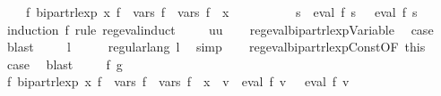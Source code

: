 \begin{isabellebody}
\ \ \ \ {\isasymexists}f{\isacharprime}{\kern0pt}{\isachardot}{\kern0pt}\ bipart{\isacharunderscore}{\kern0pt}rlexp\ x\ f{\isacharprime}{\kern0pt}\ {\isasymand}\ vars\ f{\isacharprime}{\kern0pt}\ {\isacharequal}{\kern0pt}\ vars\ f\ {\isasymunion}\ {\isacharbraceleft}{\kern0pt}x{\isacharbraceright}{\kern0pt}\ {\isasymand}\isanewline
\ \ \ \ \ \ \ \ \ {\isacharparenleft}{\kern0pt}{\isasymforall}s{\isachardot}{\kern0pt}\ {\isasymPsi}\ {\isacharparenleft}{\kern0pt}eval\ f\ s{\isacharparenright}{\kern0pt}\ {\isacharequal}{\kern0pt}\ {\isasymPsi}\ {\isacharparenleft}{\kern0pt}eval\ f{\isacharprime}{\kern0pt}\ s{\isacharparenright}{\kern0pt}{\isacharparenright}{\kern0pt}{\isachardoublequoteclose}\isanewline
%
\isadelimproof
%
\endisadelimproof
%
\isatagproof
{}\isamarkupfalse%
\ {\isacharparenleft}{\kern0pt}induction\ f\ rule{\isacharcolon}{\kern0pt}\ reg{\isacharunderscore}{\kern0pt}eval{\isachardot}{\kern0pt}induct{\isacharparenright}{\kern0pt}\isanewline
\ \ \isamarkupfalse%
\ {\isacharparenleft}{\kern0pt}{}\ uu{\isacharparenright}{\kern0pt}\isanewline
\ \ \isamarkupfalse%
\ reg{\isacharunderscore}{\kern0pt}eval{\isacharunderscore}{\kern0pt}bipart{\isacharunderscore}{\kern0pt}rlexp{\isacharunderscore}{\kern0pt}Variable\ \isamarkupfalse%
\ {\isacharquery}{\kern0pt}case\ \isamarkupfalse%
\ blast\isanewline
{}\isamarkupfalse%
\isanewline
\ \ \isamarkupfalse%
\ {\isacharparenleft}{\kern0pt}{}\ l{\isacharparenright}{\kern0pt}\isanewline
\ \ \isamarkupfalse%
\ \isamarkupfalse%
\ {\isachardoublequoteopen}regular{\isacharunderscore}{\kern0pt}lang\ l{\isachardoublequoteclose}\ \isamarkupfalse%
\ simp\isanewline
\ \ \isamarkupfalse%
\ reg{\isacharunderscore}{\kern0pt}eval{\isacharunderscore}{\kern0pt}bipart{\isacharunderscore}{\kern0pt}rlexp{\isacharunderscore}{\kern0pt}Const{\isacharbrackleft}{\kern0pt}OF\ this{\isacharbrackright}{\kern0pt}\ \isamarkupfalse%
\ {\isacharquery}{\kern0pt}case\ \isamarkupfalse%
\ blast\isanewline
{}\isamarkupfalse%
\isanewline
\ \ \isamarkupfalse%
\ {\isacharparenleft}{\kern0pt}{}\ f\ g{\isacharparenright}{\kern0pt}\isanewline
\ \ \isamarkupfalse%
\ \isamarkupfalse%
\ {\isachardoublequoteopen}{\isasymexists}f{\isacharprime}{\kern0pt}{\isachardot}{\kern0pt}\ bipart{\isacharunderscore}{\kern0pt}rlexp\ x\ f{\isacharprime}{\kern0pt}\ {\isasymand}\ vars\ f{\isacharprime}{\kern0pt}\ {\isacharequal}{\kern0pt}\ vars\ f\ {\isasymunion}\ {\isacharbraceleft}{\kern0pt}x{\isacharbraceright}{\kern0pt}\ {\isasymand}\ {\isacharparenleft}{\kern0pt}{\isasymforall}v{\isachardot}{\kern0pt}\ {\isasymPsi}\ {\isacharparenleft}{\kern0pt}eval\ f\ v{\isacharparenright}{\kern0pt}\ {\isacharequal}{\kern0pt}\ {\isasymPsi}\ {\isacharparenleft}{\kern0pt}eval\ f{\isacharprime}{\kern0pt}\ v{\isacharparenright}{\kern0pt}{\isacharparenright}{\kern0pt}{\isachardoublequoteclose}\isanewline

\end{isabellebody}
